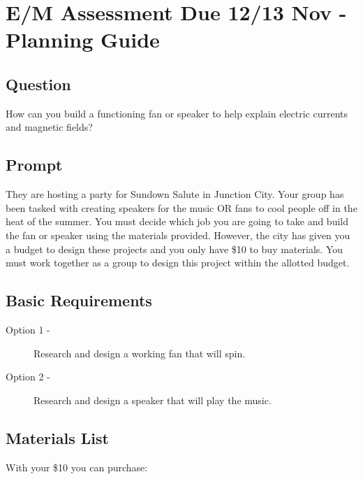 \documentclass[14pt, fleqn, paper=letter, oneside]{scrartcl}
\newcommand{\maintitle}{E/M Assessment Due 12/13 Nov - Planning Guide}
\begin{document}
\section{\maintitle}

\subsection{Question}
How can you build a functioning fan or speaker to help explain electric currents and magnetic fields?

\subsection{Prompt}
They are hosting a party for Sundown Salute in Junction City.
Your group has been tasked with creating speakers for the music OR fans to cool people off in the heat of the summer.
You must decide which job you are going to take and build the fan or speaker using the materials provided.
However, the city has given you a budget to design these projects and you only have \$10 to buy materials.
You must work together as a group to design this project within the allotted budget. 

\subsection{Basic Requirements}
\begin{description}
\item[Option 1 -] Research and design a working fan that will spin.
\item[Option 2 -] Research and design a speaker that will play the music.
\end{description}

\subsection{Materials List}
With your \$10 you can purchase:
\end{document}
